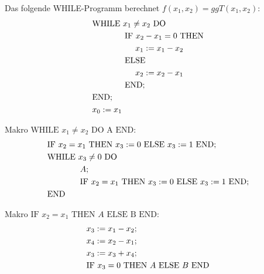 \documentclass[a4]{exam}
\begin{document}
\begin{questions}
\setcounter{question}{15}   

%
%
Das folgende WHILE-Programm berechnet $f(x_1,x_2) = ggT(x_1,x_2)$:
\begin{align}
&\text{WHILE } x_1 \ne x_2 \text{ DO} & \notag \\
&\phantom{WHILE }\text{IF } x_2 - x_1  = 0\text{ THEN} &\notag\\
&\phantom{WHILE IF} x_1:=  x_1-x_2 &\notag\\
&\phantom{WHILE }\text{ELSE } &\notag\\
&\phantom{WHILE IF} x_2 := x_2-x_1& \notag \\
&\phantom{WHILE }\text{END;} &\notag\\
&\text{END}; &\notag\\
&x_0 := x_1&\notag
\end{align}

Makro $\text{WHILE } x_1 \ne x_2 \text{ DO A END} $:
\begin{align}
&\text{IF } x_2 = x_1\text{ THEN } x_3 := 0 \text{ ELSE } x_3 := 1 \text{ END;}& \notag \\
&\text{WHILE }x_3 \ne 0 \text{ DO}& \notag \\
&\phantom{WHILE } A;&\notag\\
&\phantom{WHILE }\text{IF } x_2 = x_1\text{ THEN } x_3 := 0 \text{ ELSE } x_3 := 1 \text{ END;}& \notag \\
&\text{END}&\notag
\end{align}

Makro $ \text{IF } x_2 = x_1\text{ THEN } A \text{ ELSE B END} $:
\begin{align}
& x_3 := x_1 - x_2;& \notag \\
& x_4 := x_2 - x_1;& \notag \\
& x_3 := x_3 + x_4;& \notag \\
&\text{IF } x_3 = 0\text{ THEN } A \text{ ELSE } B \text{ END}& \notag 
\end{align}


\end{questions}
\end{document}

